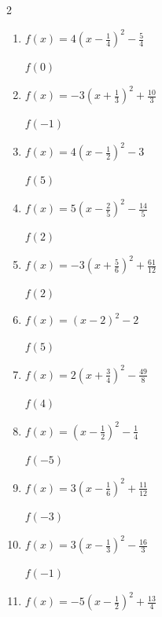 \begin{multicols}{2}
\begin{enumerate}
$f(0)$
        \phantom{$=2$}

  \item $\displaystyle f(x)=4\left( x-\frac{1}{4}\right)^{2}-\frac{5}{4}$

$f(0)$
        \phantom{$=-1$}

  \item $\displaystyle f(x)=-3\left( x+\frac{1}{3}\right)^{2}+\frac{10}{3}$

$f(-1)$
        \phantom{$=2$}

\columnbreak %

  \item $\displaystyle f(x)=4\left( x-\frac{1}{2}\right)^{2}-3$

$f(5)$
        \phantom{$=78$}

  \item $\displaystyle f(x)=5\left( x-\frac{2}{5}\right)^{2}-\frac{14}{5}$

$f(2)$
        \phantom{$=10$}

  \item $\displaystyle f(x)=-3\left( x+\frac{5}{6}\right)^{2}+\frac{61}{12}$

$f(2)$
        \phantom{$=-19$}

  \item $\displaystyle f(x)=\left( x-2\right)^{2}-2$

$f(5)$
        \phantom{$=7$}

  \item $\displaystyle f(x)=2\left( x+\frac{3}{4}\right)^{2}-\frac{49}{8}$

$f(4)$
        \phantom{$=39$}

\columnbreak %

\resetques

  \item $\displaystyle f(x)=\left( x-\frac{1}{2}\right)^{2}-\frac{1}{4}$

$f(-5)$
        \phantom{$=30$}

  \item $\displaystyle f(x)=3\left( x-\frac{1}{6}\right)^{2}+\frac{11}{12}$

$f(-3)$
        \phantom{$=31$}

  \item $\displaystyle f(x)=3\left( x-\frac{1}{3}\right)^{2}-\frac{16}{3}$

$f(-1)$
        \phantom{$=0$}

  \item $\displaystyle f(x)=-5\left( x-\frac{1}{2}\right)^{2}+\frac{13}{4}$


\end{enumerate}
\end{multicols}
